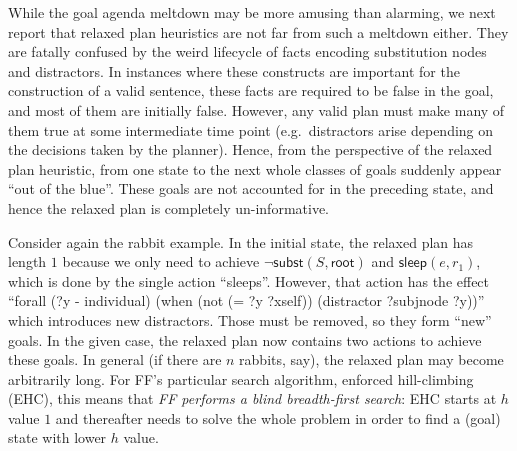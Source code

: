 While the goal agenda meltdown may be more amusing than alarming, we
next report that relaxed plan heuristics are not far from such a
meltdown either. They are fatally confused by the weird lifecycle of
facts encoding substitution nodes and distractors. In instances where
these constructs are important for the construction of a valid
sentence, these facts are required to be false in the goal, and most
of them are initially false. However, any valid plan must make many of
them true at some intermediate time point (e.g.\ distractors arise
depending on the decisions taken by the planner). Hence, from the
perspective of the relaxed plan heuristic, from one state to the next
whole classes of goals suddenly appear ``out of the blue''. These
goals are not accounted for in the preceding state, and hence the
relaxed plan is completely un-informative.


Consider again the rabbit example. In the initial state, the relaxed
plan has length $1$ because we only need to achieve $\neg
\mathsf{subst}(S,\mathsf{root})$ and $\mathsf{sleep}(e,r_1)$, which is
done by the single action ``sleeps''. However, that action has the
effect ``forall (?y - individual) (when (not (= ?y ?xself))
(distractor ?subjnode ?y))'' which introduces new distractors. Those
must be removed, so they form ``new'' goals. In the given case, the
relaxed plan now contains two actions to achieve these goals. In
general (if there are $n$ rabbits, say), the relaxed plan may become
arbitrarily long.
For FF's particular search algorithm, enforced hill-climbing (EHC),
this means that {\em FF performs a blind breadth-first search}: EHC
starts at $h$ value $1$ and thereafter needs to solve the whole
problem in order to find a (goal) state with lower $h$ value.




